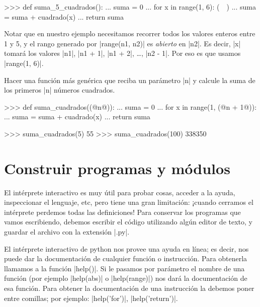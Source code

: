 \begin{problema}
\begin{solucion}
\begin{codigo-python-sn}
>>> def suma_5_cuadrados():
...     suma = 0
...     for x in range(1, 6): (~~)
...         suma = suma + cuadrado(x)
...     return suma
\end{codigo-python-sn}

 Notar que en nuestro ejemplo necesitamos recorrer todos los valores enteros
entre 1 y 5, y el rango generado por |range(n1, n2)| es \emph{abierto} en |n2|.
Es decir, |x| tomará los valores |n1|, |n1 + 1|, |n1 + 2|, \ldots, |n2 - 1|.
Por eso es que usamos |range(1, 6)|.

\end{solucion}
\end{problema}

\begin{problema}
Hacer una función más genérica que reciba un parámetro |n| y calcule la suma de
los primeros |n| números cuadrados.

\begin{solucion}
\hfill\break
\begin{codigo-python-sn}
>>> def suma_cuadrados((@n@)):
...     suma = 0
...     for x in range(1, (@n + 1@)):
...         suma = suma + cuadrado(x)
...     return suma

>>> suma_cuadrados(5)
55
>>> suma_cuadrados(100)
338350
\end{codigo-python-sn}
\end{solucion}
\end{problema}

\section{Construir programas y módulos}

El intérprete interactivo es muy útil para probar cosas, acceder a la ayuda,
inspeccionar el lenguaje, etc, pero tiene una gran limitación: ¡cuando cerramos
el intérprete perdemos todas las definiciones! Para conservar los programas que
vamos escribiendo, debemos escribir el código utilizando algún editor de texto,
y guardar el archivo con la extensión |.py|.

\begin{sabias_que}
El intérprete interactivo de python nos provee una ayuda en línea; es decir,
nos puede dar la documentación de cualquier función o instrucción. Para
obtenerla llamamos a la función |help()|. Si le pasamos por parámetro el nombre
de una función (por ejemplo |help(abs)| o |help(range)|) nos dará la
documentación de esa función. Para obtener la documentación de una instrucción
la debemos poner entre comillas; por ejemplo: |help('for')|, |help('return')|.
\end{sabias_que}

